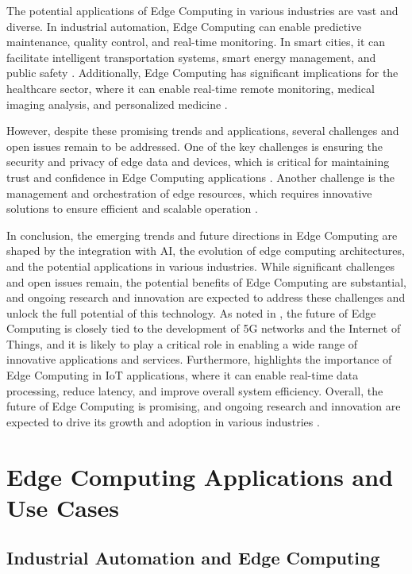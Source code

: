 \documentclass[11pt,a4paper]{article}
\begin{document}
The potential applications of Edge Computing in various industries are vast and diverse. In industrial automation, Edge Computing can enable predictive maintenance, quality control, and real-time monitoring. In smart cities, it can facilitate intelligent transportation systems, smart energy management, and public safety \cite{arxiv:1909.08747}. Additionally, Edge Computing has significant implications for the healthcare sector, where it can enable real-time remote monitoring, medical imaging analysis, and personalized medicine \cite{arxiv:2004.07311}.

However, despite these promising trends and applications, several challenges and open issues remain to be addressed. One of the key challenges is ensuring the security and privacy of edge data and devices, which is critical for maintaining trust and confidence in Edge Computing applications \cite{arxiv:2206.07164}. Another challenge is the management and orchestration of edge resources, which requires innovative solutions to ensure efficient and scalable operation \cite{arxiv:2005.10460}.

In conclusion, the emerging trends and future directions in Edge Computing are shaped by the integration with AI, the evolution of edge computing architectures, and the potential applications in various industries. While significant challenges and open issues remain, the potential benefits of Edge Computing are substantial, and ongoing research and innovation are expected to address these challenges and unlock the full potential of this technology. As noted in \cite{arxiv:1703.10750}, the future of Edge Computing is closely tied to the development of 5G networks and the Internet of Things, and it is likely to play a critical role in enabling a wide range of innovative applications and services. Furthermore, \cite{arxiv:2402.13056} highlights the importance of Edge Computing in IoT applications, where it can enable real-time data processing, reduce latency, and improve overall system efficiency. Overall, the future of Edge Computing is promising, and ongoing research and innovation are expected to drive its growth and adoption in various industries \cite{arxiv:2107.13374}.


\section{Edge Computing Applications and Use Cases}



\subsection{Industrial Automation and Edge Computing}
\end{document}
